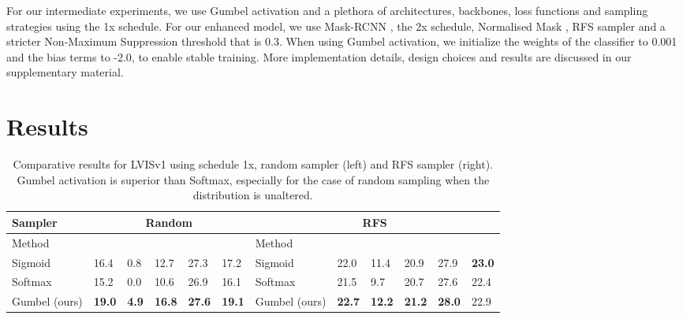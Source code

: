 \documentclass[runningheads]{llncs}
\begin{document}
For our intermediate experiments, we use Gumbel activation and a plethora of architectures, backbones, loss functions and sampling strategies using the 1x schedule. For our enhanced  model, we use Mask-RCNN \cite{he2017mask}, the 2x schedule, Normalised Mask \cite{wang2021seesaw}, RFS sampler \cite{gupta2019lvis} and a stricter Non-Maximum Suppression threshold that is 0.3. When using Gumbel activation, we initialize the weights of the classifier to 0.001 and the bias terms to -2.0, to enable stable training. More implementation details, design choices and results are discussed in our supplementary material.




\section{Results}
\label{sec:experiments}



\begin{table*}[t]
\centering
\caption{Comparative results for LVISv1 using schedule 1x, random sampler (left) and RFS \cite{gupta2019lvis} sampler (right). Gumbel activation is superior than Softmax, especially for the case of random sampling when the distribution is unaltered.}
\label{my-label}
\begin{tabular}{l|l|l|l|l|l||l|l|l|l|l|l}

Sampler &
\multicolumn{5}{c||}{Random}&\multicolumn{6}{c}{RFS \cite{gupta2019lvis}}\\
\hline
Method &&&&&&Method &&&&& \\
\hline
Sigmoid&16.4 &0.8 &12.7 &27.3 &17.2 & Sigmoid&22.0 &11.4 &20.9 &27.9 &\textbf{23.0}\\
Softmax &15.2 & 0.0& 10.6 &26.9&16.1& Softmax &21.5 & 9.7& 20.7 &27.6&22.4\\
Gumbel (ours) & \textbf{19.0}&\textbf{4.9}&\textbf{16.8}&\textbf{27.6}&\textbf{19.1}&Gumbel (ours) & \textbf{22.7}&\textbf{12.2}&\textbf{21.2}&\textbf{28.0}&22.9\\

\end{tabular}
\label{tab:samplers}
\end{table*}
\end{document}
